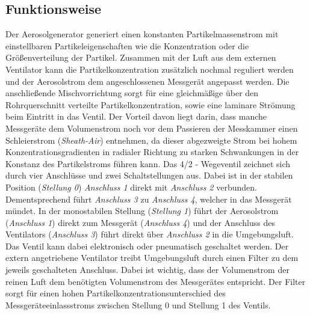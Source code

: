 \subsection{Funktionsweise}
Der Aerosolgenerator generiert einen konstanten Partikelmassenstrom mit einstellbaren Partikeleigenschaften wie die Konzentration oder die Gr\"{o}{\ss}enverteilung der Partikel. Zusammen mit der Luft aus dem externen Ventilator kann die Partikelkonzentration zus\"{a}tzlich nochmal reguliert werden und der Aerosolstrom dem angeschlossenen Messger\"{a}t angepasst werden. Die anschlie{\ss}ende Mischvorrichtung sorgt f\"{u}r eine gleichm\"{a}{\ss}ige \"{u}ber den Rohrquerschnitt verteilte Partikelkonzentration, sowie eine laminare Str\"{o}mung beim Eintritt in das Ventil. Der Vorteil davon liegt darin, dass manche Messger\"{a}te dem Volumenstrom noch vor dem Passieren der Messkammer einen Schleierstrom (\textit{Sheath-Air}) entnehmen, da dieser abgezweigte Strom bei hohem Konzentrationsgradienten in radialer Richtung zu starken Schwankungen in der Konstanz des Partikelstroms f\"{u}hren kann. Das 4/2 - Wegeventil zeichnet sich durch vier Anschl\"{u}sse und zwei Schaltstellungen aus. Dabei ist in der stabilen Position (\textit{Stellung 0}) \textit{Anschluss 1} direkt mit \textit{Anschluss 2} verbunden. Dementsprechend f\"{u}hrt \textit{Anschluss 3} zu \textit{Anschluss 4}, welcher in das Messger\"{a}t m\"{u}ndet. In der monostabilen Stellung (\textit{Stellung 1}) f\"{u}hrt der Aerosolstrom (\textit{Anschluss 1}) direkt zum Messger\"{a}t (\textit{Anschluss 4}) und der Anschluss des Ventilators (\textit{Anschluss 3}) f\"{u}hrt direkt \"{u}ber \textit{Anschluss 2} in die Umgebungsluft. Das Ventil kann dabei elektronisch oder pneumatisch geschaltet werden. Der extern angetriebene Ventilator treibt Umgebungsluft durch einen Filter zu dem jeweils geschalteten Anschluss. Dabei ist wichtig, dass der Volumenstrom der reinen Luft dem ben\"{o}tigten Volumenstrom des Messger\"{a}tes entspricht. Der Filter sorgt f\"{u}r einen hohen Partikelkonzentrationsunterschied des Messger\"{a}teeinlassstroms zwischen Stellung 0 und Stellung 1 des Ventils.

